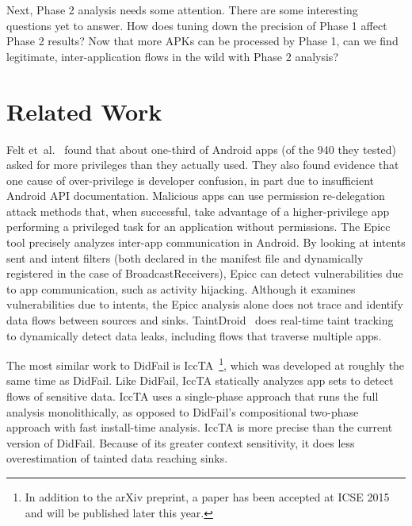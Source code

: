 Next, Phase 2 analysis needs some attention. There are some interesting questions yet to answer. How does tuning down the precision of Phase 1 affect Phase 2 results?  Now that more APKs can be processed by Phase 1, can we find legitimate, inter-application flows in the wild with Phase 2 analysis?
\newpage
\chapter{Related Work}
Felt et\ al.~\cite{felt2011android} found that about one-third of Android apps (of the 940 they tested) asked for more privileges than they actually used. They also found evidence that one cause of over-privilege is developer confusion, in part due to insufficient Android API documentation. Malicious apps can use permission re-delegation attack methods \cite{felt2011permission} that, when successful, take advantage of a higher-privilege app performing a privileged task for an application without permissions. The Epicc \cite{epicc} tool precisely analyzes inter-app communication in Android.  By looking at intents sent and intent filters (both declared in the manifest file and  dynamically registered in the case of BroadcastReceivers), Epicc can detect vulnerabilities due to app communication, such as activity hijacking. Although it examines vulnerabilities due to intents, the Epicc analysis alone does not trace and identify data flows between sources and sinks. 
TaintDroid~\cite{enck2010taintdroid} does real-time taint tracking to dynamically detect data leaks, including flows that traverse multiple apps.

The most similar work to DidFail is IccTA~\cite{li2014know}\footnote{In addition to the arXiv preprint, a paper has been accepted at ICSE 2015 and will be published later this year.}, which was developed at roughly the same time as DidFail.  Like DidFail, IccTA statically analyzes app sets to detect flows of sensitive data. IccTA uses a single-phase approach that runs the full analysis monolithically, as opposed to DidFail's compositional two-phase approach with fast install-time analysis. IccTA is more precise than the current version of DidFail. Because of its greater context sensitivity, it does less overestimation of tainted data reaching sinks.

